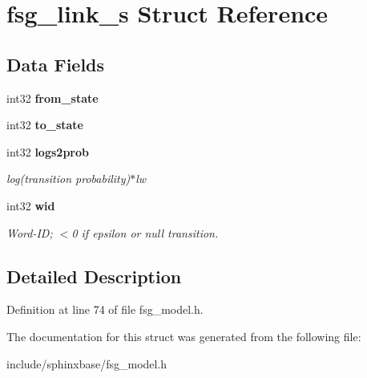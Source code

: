 \section{fsg\-\_\-link\-\_\-s Struct Reference}
\label{structfsg__link__s}
\subsection*{Data Fields}
\begin{DoxyCompactItemize}
\item 
int32 {\bfseries from\-\_\-state}\label{structfsg__link__s_a850cdf896c09f6dbc3c9f466dab6c7f3}

\item 
int32 {\bfseries to\-\_\-state}\label{structfsg__link__s_a8a9270888e6aeca95db7119598797db6}

\item 
int32 {\bf logs2prob}\label{structfsg__link__s_a4bc31131cca140338254c43eada509dc}

\begin{DoxyCompactList}\small\item\em log(transition probability)$\ast$lw \end{DoxyCompactList}\item 
int32 {\bf wid}\label{structfsg__link__s_a99b8eb916944d981adf2c492b8193d4e}

\begin{DoxyCompactList}\small\item\em Word-\/\-I\-D; $<$0 if epsilon or null transition. \end{DoxyCompactList}\end{DoxyCompactItemize}


\subsection{Detailed Description}


Definition at line 74 of file fsg\-\_\-model.\-h.



The documentation for this struct was generated from the following file\-:\begin{DoxyCompactItemize}
\item 
include/sphinxbase/fsg\-\_\-model.\-h\end{DoxyCompactItemize}
